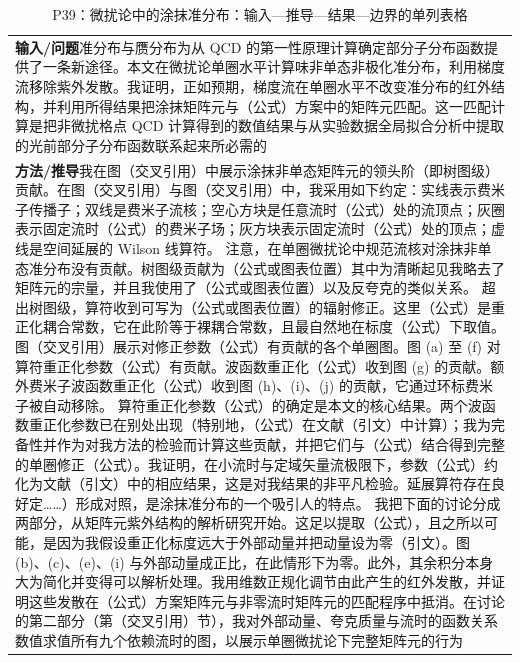 \documentclass[UTF8,11pt,oneside]{ctexbook}
\begin{document}
\begin{table}[htbp]
  \centering
  \caption*{P39：微扰论中的涂抹准分布：输入—推导—结果—边界的单列表格}
  \small
  \begin{tabular}{@{}p{}@{}}
    \toprule
    \textbf{输入/问题}\quad 准分布与赝分布为从 QCD 的第一性原理计算确定部分子分布函数提供了一条新途径。本文在微扰论单圈水平计算味非单态非极化准分布，利用梯度流移除紫外发散。我证明，正如预期，梯度流在单圈水平不改变准分布的红外结构，并利用所得结果把涂抹矩阵元与（公式）方案中的矩阵元匹配。这一匹配计算是把非微扰格点 QCD 计算得到的数值结果与从实验数据全局拟合分析中提取的光前部分子分布函数联系起来所必需的 \\
    \textbf{方法/推导}\quad 我在图（交叉引用）中展示涂抹非单态矩阵元的领头阶（即树图级）贡献。在图（交叉引用）与图（交叉引用）中，我采用如下约定：实线表示费米子传播子；双线是费米子流核；空心方块是任意流时（公式）处的流顶点；灰圈表示固定流时（公式）的费米子场；灰方块表示固定流时（公式）处的顶点；虚线是空间延展的 Wilson 线算符。 注意，在单圈微扰论中规范流核对涂抹非单态准分布没有贡献。树图级贡献为（公式或图表位置）其中为清晰起见我略去了矩阵元的宗量，并且我使用了（公式或图表位置）以及反夸克的类似关系。 超出树图级，算符收到可写为（公式或图表位置）的辐射修正。这里（公式）是重正化耦合常数，它在此阶等于裸耦合常数，且最自然地在标度（公式）下取值。图（交叉引用）展示对修正参数（公式）有贡献的各个单圈图。图 (a) 至 (f) 对算符重正化参数（公式）有贡献。波函数重正化（公式）收到图 (g) 的贡献。额外费米子波函数重正化（公式）收到图 (h)、(i)、(j) 的贡献，它通过环标费米子被自动移除。 算符重正化参数（公式）的确定是本文的核心结果。两个波函数重正化参数已在别处出现（特别地，（公式）在文献（引文）中计算）；我为完备性并作为对我方法的检验而计算这些贡献，并把它们与（公式）结合得到完整的单圈修正（公式）。我证明，在小流时与定域矢量流极限下，参数（公式）约化为文献（引文）中的相应结果，这是对我结果的非平凡检验。延展算符存在良好定……）形成对照，是涂抹准分布的一个吸引人的特点。 我把下面的讨论分成两部分，从矩阵元紫外结构的解析研究开始。这足以提取（公式），且之所以可能，是因为我假设重正化标度远大于外部动量并把动量设为零（引文）。图 (b)、(c)、(e)、(i) 与外部动量成正比，在此情形下为零。此外，其余积分本身大为简化并变得可以解析处理。我用维数正规化调节由此产生的红外发散，并证明这些发散在（公式）方案矩阵元与非零流时矩阵元的匹配程序中抵消。在讨论的第二部分（第（交叉引用）节），我对外部动量、夸克质量与流时的函数关系数值求值所有九个依赖流时的图，以展示单圈微扰论下完整矩阵元的行为 \\

\end{tabular}
\end{table}
\end{document}
